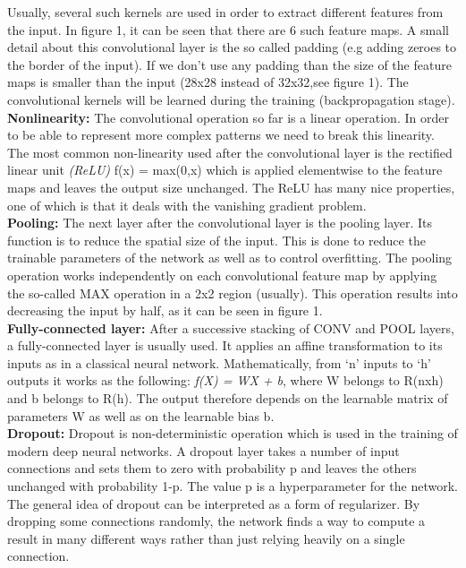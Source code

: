 \documentclass[a4paper]{article}
\begin{document}
\begin{justify}
Usually, several such kernels are used in order to extract different features from the input. In figure 1, it can be seen that there are 6 such feature maps. A small detail about this convolutional layer is the so called padding (e.g adding zeroes to the border of the input). If we don't use any padding than the size of the feature maps is smaller than the input (28x28 instead of 32x32,see figure 1). The convolutional kernels will be learned during the training (backpropagation stage).
\newline
\\
\textbf{Nonlinearity:} The convolutional operation so far is a linear operation. In order to be able to represent more complex patterns we need to break this linearity. The most common non-linearity used after the convolutional layer is the rectified linear unit \textit{(ReLU)} f(x) = max(0,x) which is applied elementwise to the feature maps and leaves the output size unchanged. The ReLU has many nice properties, one of which is that it deals with the vanishing gradient problem. 
\newline
\\
\textbf{Pooling:} The next layer after the convolutional layer is the pooling layer. Its function is to reduce the spatial size of the input. This is done to reduce the trainable parameters of the network as well as to control overfitting. The pooling operation works independently on each convolutional feature map by applying the so-called MAX operation in a 2x2 region (usually). This operation results into decreasing the input by half, as it can be seen in figure 1. 
\newline
\\
\textbf{Fully-connected layer:} After a successive stacking of CONV and POOL layers, a fully-connected layer is usually used. It applies an affine transformation to its inputs as in a classical neural network. Mathematically, from `n' inputs to `h' outputs it works as the following: \textit{f(X) = WX + b}, where W belongs to R(nxh) and b belongs to R(h). The output therefore depends on the learnable matrix of parameters W as well as on the learnable bias b.
\newline
\\
\textbf{Dropout:} Dropout is non-deterministic operation which is used in the training of modern deep neural networks. A dropout layer takes a number of input connections and sets them to zero with probability p and leaves the others unchanged with probability 1-p. The value p is a hyperparameter for the network. The general idea of dropout can be interpreted as a form of regularizer. By dropping some connections randomly, the network finds a way to compute a result in many different ways rather than just relying heavily on a single connection. 

\end{justify}
\end{document}
